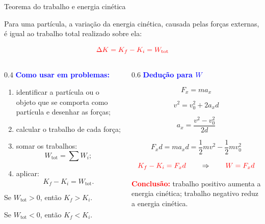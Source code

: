 \documentclass{beamer}
\begin{document}
	
	\begin{frame}{Teorema do trabalho e energia cinética}
		\scriptsize
		
		Para uma partícula, a variação da energia cinética, causada pelas forças externas, é igual ao trabalho total realizado sobre ela:
		
		\[
		\textcolor{red}{\Delta K=K_f-K_i=W_{\text{tot}}}
		\]
		
		\begin{columns}[T]
			\begin{column}{0.4\textwidth}
				\textcolor{blue}{\textbf{Como usar em problemas:}}
				\begin{enumerate}
					\item identificar a partícula ou o objeto que se comporta como partícula e desenhar as forças;
					\item calcular o trabalho de cada força;
					\item somar os trabalhos:
					\[
					W_{\text{tot}}=\sum W_i;
					\]
					\item aplicar:
					\[
					K_f-K_i=W_{\text{tot}}.
					\]
				\end{enumerate}
				
				\vspace{0.1cm}
				Se \(W_{\text{tot}}>0\), então \(K_f>K_i\).  
				
				Se \(W_{\text{tot}}<0\), então \(K_f<K_i\).
			\end{column}
			
			\begin{column}{0.6\textwidth}
				\textcolor{blue}{\textbf{Dedução para \(W\)}}
				
				\[
				F_x=ma_x
				\]
				
				\[
				v^2=v_0^2+2a_xd
				\]
				
				\[
				a_x=\frac{v^2-v_0^2}{2d}
				\]
				
				\[
				F_xd=ma_xd
				=\frac12mv^2-\frac12mv_0^2
				\]
				
				\[
				\textcolor{red}{K_f-K_i=F_xd}
				\qquad \Rightarrow \qquad
				\textcolor{red}{W=F_xd}
				\]
				
				\vspace{0.05cm}
				\textcolor{red}{\textbf{Conclusão:}} trabalho positivo aumenta a energia cinética; trabalho negativo reduz a energia cinética.
			\end{column}
		\end{columns}
		
	\end{frame}
	
\end{document}

